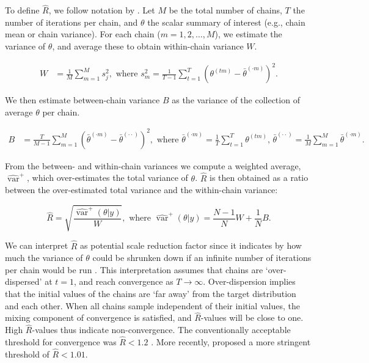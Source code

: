 \documentclass[Royal,times,sageh]{sagej}
\begin{document}
To define \(\widehat{R}\), we follow notation by \citep[p.~5]{veht19}.
Let \(M\) be the total number of chains, \(T\) the number of iterations
per chain, and \(\theta\) the scalar summary of interest (e.g., chain
mean or chain variance). For each chain (\(m = 1, 2, \dots, M\)), we
estimate the variance of \(\theta\), and average these to obtain
within-chain variance \(W\).

\begin{align*}
W&=\frac{1}{M} \sum_{m=1}^{M} s_{j}^{2},  \text { where } s_{m}^{2}=\frac{1}{T-1} \sum_{t=1}^{T}\left(\theta^{(t m)}-\bar{\theta}^{(\cdot m)}\right)^{2}. 
\end{align*}

We then estimate between-chain variance \(B\) as the variance of the
collection of average \(\theta\) per chain.

\begin{align*}
B&=\frac{T}{M-1} \sum_{m=1}^{M}\left(\bar{\theta}^{(\cdot m)}-\bar{\theta}^{(\cdot \cdot)}\right)^{2}, \text { where } \bar{\theta}^{(\cdot m)}=\frac{1}{T} \sum_{t=1}^{T} \theta^{(t m)} \text{, } \bar{\theta}^{(\cdot \cdot)}=\frac{1}{M} \sum_{m=1}^{M} \bar{\theta}^{(\cdot m)}. 
\end{align*}

From the between- and within-chain variances we compute a weighted
average, \(\widehat{\operatorname{var}}^{+}\), which over-estimates the
total variance of \(\theta\). \(\widehat{R}\) is then obtained as a
ratio between the over-estimated total variance and the within-chain
variance:

\begin{equation*}
\widehat{R}=\sqrt{\frac{\widehat{\operatorname{var}}^{+}(\theta | y)}{W}},
\text{ where } \widehat{\operatorname{var}}^{+}(\theta | y)=\frac{N-1}{N} W+\frac{1}{N} B.
\end{equation*}

We can interpret \(\widehat{R}\) as potential scale reduction factor
since it indicates by how much the variance of \(\theta\) could be
shrunken down if an infinite number of iterations per chain would be run
\citep{gelm92}. This interpretation assumes that chains are
`over-dispersed' at \(t=1\), and reach convergence as \(T \to \infty\).
Over-dispersion implies that the initial values of the chains are `far
away' from the target distribution and each other. When all chains
sample independent of their initial values, the mixing component of
convergence is satisfied, and \(\widehat{R}\)-values will be close to
one. High \(\widehat{R}\)-values thus indicate non-convergence. The
conventionally acceptable threshold for convergence was
\(\widehat{R} < 1.2\) \citep{gelm92}. More recently, \citet{veht19}
proposed a more stringent threshold of \(\widehat{R} < 1.01\).
\end{document}
